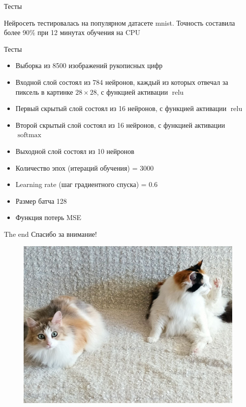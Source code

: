 \documentclass{beamer}
\newcommand{\relu}{\operatorname{relu}}
\newcommand{\softmax}{\operatorname{softmax}}
\begin{document}
\begin{frame}{Тесты}
    \begin{center}
        Нейросеть тестировалась на популярном датасете mnist.
        Точность составила более 90\% при 12 минутах обучения на CPU
    \end{center}
\end{frame}


\begin{frame}{Тесты}
    \begin{itemize}
        \item Выборка из 8500 изображений рукописных цифр \pause
        \item Входной слой состоял из 784 нейронов, каждый из которых отвечал за пиксель в картинке $28 \times 28$, с функцией активации $\relu$ \pause
        \item Первый скрытый слой состоял из 16 нейронов, с функцией активации $\relu$ \pause
        \item Второй скрытый слой состоял из 16 нейронов, с функцией активации $\softmax$ \pause
        \item Выходной слой состоял из 10 нейронов \pause
        \item Количество эпох (итераций обучения) = 3000 \pause
        \item Learning rate (шаг градиентного спуска) = 0.6 \pause
        \item Размер батча 128 \pause
        \item Функция потерь MSE
    \end{itemize}
\end{frame}

\begin{frame}{The end}
    \centering
        Спасибо за внимание!
        \begin{figure}[t]
        \includegraphics[scale=0.17]{cats.jpg}
            \centering
        \end{figure}
    \end{frame}
\end{document}

